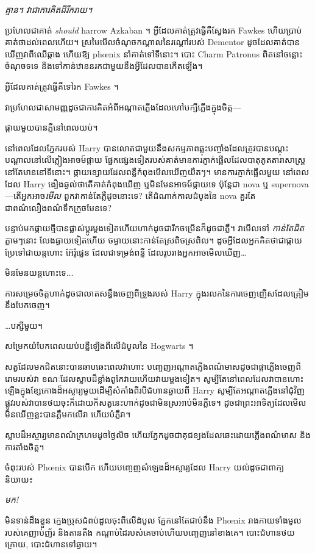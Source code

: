 \emph{គ្មាន។ វាជាការគិតដ៏រីករាយ។}

ប្រហែលជាគាត់ \emph{should} harrow Azkaban ។ អ្វីដែលគាត់ត្រូវធ្វើគឺស្វែងរក Fawkes ហើយប្រាប់គាត់ថាដល់ពេលហើយ។ ស្រមៃមើលចំណុចកណ្តាលនៃរណ្តៅរបស់ Dementor ដូចដែលគាត់បានឃើញវាពីឈើឆ្កាង ហើយឱ្យ phœnix នាំគាត់ទៅទីនោះ។ បោះ Charm Patronus ពិតនៅចន្លោះចំណុចទទេ និងទៅកាន់ឋាននរកជាមួយនឹងអ្វីដែលបានកើតឡើង។

អ្វីដែលគាត់ត្រូវធ្វើគឺទៅរក Fawkes ។

វា​ប្រហែល​ជា​សាមញ្ញ​ដូច​ជា​ការ​គិត​អំពី​អណ្ដាតភ្លើង​ដែល​ហៅ​បក្សី​ភ្លើង​ក្នុង​ចិត្ត—

ផ្កាយមួយបានភ្លឺនៅពេលយប់។

នៅពេលដែលភ្នែករបស់ Harry បានលោតជាមួយនឹងសកម្មភាពឆ្លុះបញ្ចាំងដែលត្រូវបានបណ្តុះបណ្តាលនៅលើភ្លៀងអាចម៍ផ្កាយ ផ្នែកផ្សេងទៀតរបស់គាត់មានការភ្ញាក់ផ្អើលដែលបាតុភូតតារាសាស្ត្រនៅតែមាននៅទីនោះ។ ផ្កាយ​ខ្សោយ​ដែល​ពន្លឺ​កំពុង​មើល​ឃើញ​យឺតៗ។ មានការភ្ញាក់ផ្អើលមួយ នៅពេលដែល Harry ងឿងឆ្ងល់ថាតើគាត់កំពុងឃើញ ឬមិនមែនអាចម៍ផ្កាយទេ ប៉ុន្តែជា nova ឬ supernova—តើអ្នកអាច\emph{មើល} ពួកវាកាន់តែភ្លឺដូចនោះទេ? តើដំណាក់កាលដំបូងនៃ nova គួរតែជាពណ៌លឿងពណ៌ទឹកក្រូចមែនទេ?

បន្ទាប់មកផ្កាយថ្មីបានផ្លាស់ប្តូរម្តងទៀតហើយហាក់ដូចជារីកចម្រើនក៏ដូចជាភ្លឺ។ វាមើលទៅ \emph{កាន់តែជិត} ភ្លាមៗនោះ លែងឆ្ងាយទៀតហើយ ចម្ងាយនោះកាន់តែស្រពិចស្រពិល។ ដូចអ្វីដែលអ្នកគិតថាជាផ្កាយ ប្រែទៅជាយន្តហោះ អ៊ែរ៉ូផ្លេន ដែលជាទម្រង់ពន្លឺ ដែលរូបរាងអ្នកអាចមើលឃើញ…

មិនមែនយន្តហោះទេ...

ការ​សម្រេច​ចិត្ត​ហាក់​ដូច​ជា​លាត​សន្ធឹង​ចេញ​ពី​ទ្រូង​របស់ Harry ក្នុង​រលក​នៃ​ការ​ចេញ​ញើស​ដែល​ត្រៀម​នឹង​បែក​ចេញ។

…បក្សីមួយ។

សម្រែក​យំ​បែក​ពេល​យប់​បន្លឺ​ឡើង​ពី​លើ​ដំបូល​នៃ Hogwarts ។

សត្វ​ដែល​មក​ជិត​នោះ​បាន​ឆាបឆេះ​ពេល​វា​ហោះ បញ្ចេញ​អណ្តាតភ្លើង​ពណ៌​មាស​ដូច​ជា​ផ្កាភ្លើង​ចេញ​ពី​រោម​របស់​វា ខណៈ​ដែល​ស្លាប​ដ៏​ខ្លាំង​ពូកែ​វាយ​ហើយ​វាយ​ម្ដង​ទៀត។ សូម្បីតែនៅពេលដែលវាបានហោះឡើងក្នុងខ្សែកោងដ៏អស្ចារ្យមួយដើម្បីសំកាំងពីរបីជំហានឆ្ងាយពី Harry សូម្បីតែអណ្តាតភ្លើងនៅជុំវិញផ្លូវរបស់វាបានថយចុះក៏ដោយក៏សត្វនេះហាក់ដូចជាមិនស្រអាប់មិនភ្លឺទេ។ ដូចជាព្រះអាទិត្យដែលមើលមិនឃើញខ្លះបានភ្លឺមកលើវា ហើយបំភ្លឺវា។

ស្លាបដ៏អស្ចារ្យមានពណ៌ក្រហមដូចថ្ងៃលិច ហើយភ្នែកដូចជាគុជខ្យងដែលឆេះដោយភ្លើងពណ៌មាស និងការតាំងចិត្ត។

ចំពុះរបស់ Phœnix បានបើក ហើយបញ្ចេញសំឡេងដ៏អស្ចារ្យដែល Harry យល់ដូចជាពាក្យនិយាយ៖

\emph{មក!}

មិន​ទាន់​ដឹង​ខ្លួន ក្មេង​ប្រុស​ជំពប់​ដួល​ចុះ​ពី​លើ​ដំបូល ភ្នែក​នៅ​តែ​ជាប់​នឹង Phœnix រាង​កាយ​ទាំង​មូល​របស់​គេ​ញាប់​ញ័រ និង​តាន​តឹង កណ្តាប់​ដៃ​របស់​គេ​ចាប់​ហើយ​បញ្ចេញ​នៅ​ខាង​គេ។ បោះជំហានថយក្រោយ, បោះជំហានទៅឆ្ងាយ។

